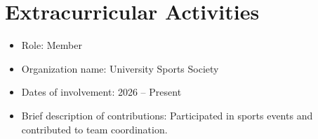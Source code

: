 \documentclass{article}
\begin{document}
\section{Extracurricular Activities}
\begin{itemize}
    \item Role: Member
    \item Organization name: University Sports Society
    \item Dates of involvement: 2026 -- Present
    \item Brief description of contributions: Participated in sports events and contributed to team coordination.
\end{itemize}
\end{document}
